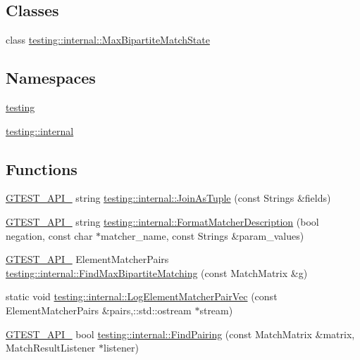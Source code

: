 \subsection*{Classes}
\begin{DoxyCompactItemize}
\item 
class \hyperlink{classtesting_1_1internal_1_1MaxBipartiteMatchState}{testing\+::internal\+::\+Max\+Bipartite\+Match\+State}
\end{DoxyCompactItemize}
\subsection*{Namespaces}
\begin{DoxyCompactItemize}
\item 
 \hyperlink{namespacetesting}{testing}
\item 
 \hyperlink{namespacetesting_1_1internal}{testing\+::internal}
\end{DoxyCompactItemize}
\subsection*{Functions}
\begin{DoxyCompactItemize}
\item 
\hyperlink{gtest-port_8h_aa73be6f0ba4a7456180a94904ce17790}{G\+T\+E\+S\+T\+\_\+\+A\+P\+I\+\_\+} string \hyperlink{namespacetesting_1_1internal_a61d60981533cb0875bad9025e0d98b74}{testing\+::internal\+::\+Join\+As\+Tuple} (const Strings \&fields)
\item 
\hyperlink{gtest-port_8h_aa73be6f0ba4a7456180a94904ce17790}{G\+T\+E\+S\+T\+\_\+\+A\+P\+I\+\_\+} string \hyperlink{namespacetesting_1_1internal_a593b52fcbb46a765a31850661b1960f4}{testing\+::internal\+::\+Format\+Matcher\+Description} (bool negation, const char $\ast$matcher\+\_\+name, const Strings \&param\+\_\+values)
\item 
\hyperlink{gtest-port_8h_aa73be6f0ba4a7456180a94904ce17790}{G\+T\+E\+S\+T\+\_\+\+A\+P\+I\+\_\+} Element\+Matcher\+Pairs \hyperlink{namespacetesting_1_1internal_ae30bd8357c179334b2b09b0d689efccc}{testing\+::internal\+::\+Find\+Max\+Bipartite\+Matching} (const Match\+Matrix \&g)
\item 
static void \hyperlink{namespacetesting_1_1internal_a482c05e696259e3326a42d2e5e815a2d}{testing\+::internal\+::\+Log\+Element\+Matcher\+Pair\+Vec} (const Element\+Matcher\+Pairs \&pairs,\+::std\+::ostream $\ast$stream)
\item 
\hyperlink{gtest-port_8h_aa73be6f0ba4a7456180a94904ce17790}{G\+T\+E\+S\+T\+\_\+\+A\+P\+I\+\_\+} bool \hyperlink{namespacetesting_1_1internal_af2bd2e350b56422a3d9d3b986ac1df0e}{testing\+::internal\+::\+Find\+Pairing} (const Match\+Matrix \&matrix, Match\+Result\+Listener $\ast$listener)
\end{DoxyCompactItemize}
